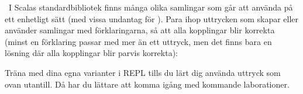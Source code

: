 
% 







% 







\QUESTBEGIN

\Task \what~I Scalas standardbibliotek finns många olika samlingar som går att använda på ett enhetligt sätt (med vissa undantag för ). Para ihop uttrycken som skapar eller använder samlingar med förklaringarna, så att alla kopplingar blir korrekta (minst en förklaring passar med mer än ett uttryck, men det finns bara en lösning där alla kopplingar blir parvis korrekta):

\begin{ConceptConnections}

\end{ConceptConnections}

\noindent Träna med dina egna varianter i REPL tills du lärt dig använda uttryck som ovan utantill. Då har du lättare att komma igång med kommande laborationer.

\SOLUTION

\TaskSolved \what

\begin{ConceptConnections}

\end{ConceptConnections}

